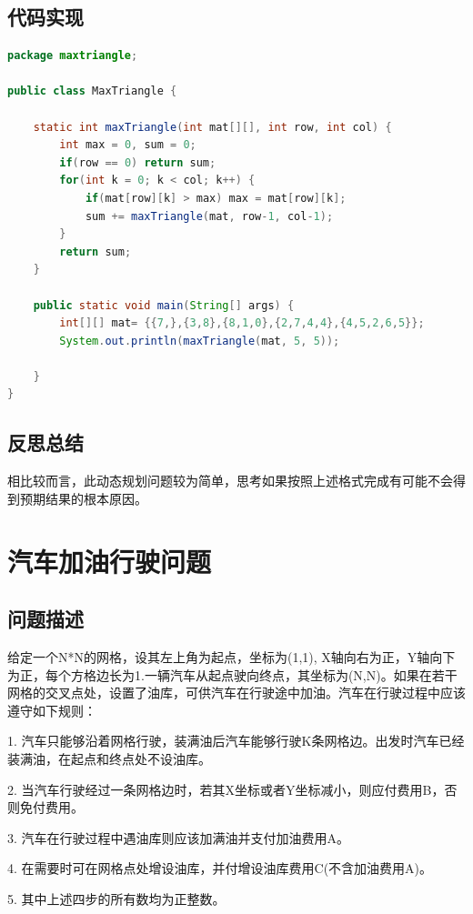 \documentclass[UTF8]{ctexart}
\begin{document}
    \subsection{代码实现}
\begin{small}
\begin{lstlisting}[language=java]
package maxtriangle;

public class MaxTriangle {
	
	static int maxTriangle(int mat[][], int row, int col) {
		int max = 0, sum = 0;
		if(row == 0) return sum;
		for(int k = 0; k < col; k++) {
			if(mat[row][k] > max) max = mat[row][k];
			sum += maxTriangle(mat, row-1, col-1);
		}
		return sum;
	}
	
	public static void main(String[] args) {
		int[][] mat= {{7,},{3,8},{8,1,0},{2,7,4,4},{4,5,2,6,5}};
		System.out.println(maxTriangle(mat, 5, 5));
		
	}
}
\end{lstlisting}
\end{small}

    \subsection{反思总结}
    相比较而言，此动态规划问题较为简单，思考如果按照上述格式完成有可能不会得到预期结果的根本原因。

    \section{汽车加油行驶问题}
    \subsection{问题描述}
    给定一个N*N的网格，设其左上角为起点，坐标为(1,1), X轴向右为正，Y轴向下为正，每个方格边长为1.一辆汽车从起点驶向终点，其坐标为(N,N)。如果在若干网格的交叉点处，设置了油库，可供汽车在行驶途中加油。汽车在行驶过程中应该遵守如下规则：

    1. 汽车只能够沿着网格行驶，装满油后汽车能够行驶K条网格边。出发时汽车已经装满油，在起点和终点处不设油库。

    2. 当汽车行驶经过一条网格边时，若其X坐标或者Y坐标减小，则应付费用B，否则免付费用。

    3. 汽车在行驶过程中遇油库则应该加满油并支付加油费用A。

    4. 在需要时可在网格点处增设油库，并付增设油库费用C(不含加油费用A)。

    5. 其中上述四步的所有数均为正整数。
\end{document}
